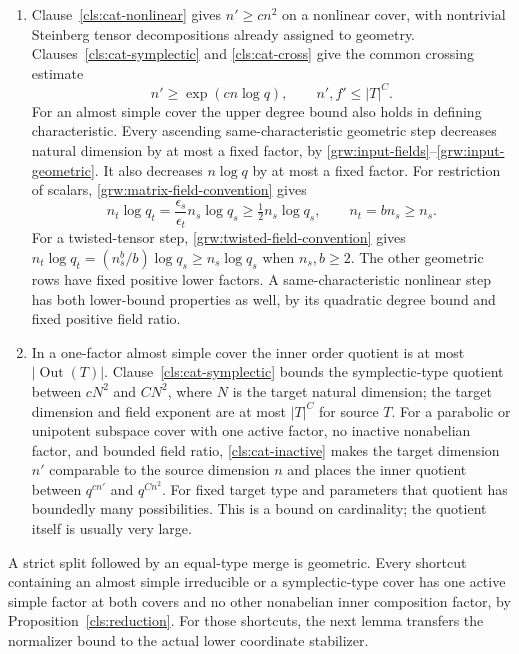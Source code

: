 \begin{enumerate}[label=\textup{(G\arabic*)},ref=G\arabic*]
\item\label{grw:input-degrees}
Clause~\ref{cls:cat-nonlinear} gives $n'\ge c n^2$ on a nonlinear
cover, with nontrivial Steinberg tensor decompositions already
assigned to geometry. Clauses~\ref{cls:cat-symplectic} and
\ref{cls:cat-cross} give the common crossing estimate
\begin{equation}\label{grw:cross-bounds}
 n'\ge \exp(c n\log q),\qquad n',f'\le |T|^C.
\end{equation}
For an almost simple cover the upper degree bound also holds in
defining characteristic.
Every ascending same-characteristic geometric step decreases natural
dimension by at most a fixed factor, by
\ref{grw:input-fields}--\ref{grw:input-geometric}. It also decreases
$n\log q$ by at most a fixed factor. For restriction of scalars,
\eqref{grw:matrix-field-convention} gives
\[
 n_t\log q_t
 =\frac{\epsilon_s}{\epsilon_t}n_s\log q_s
 \ge\tfrac12 n_s\log q_s,
 \qquad n_t=b n_s\ge n_s.
\]
For a twisted-tensor step,
\eqref{grw:twisted-field-convention} gives
$n_t\log q_t=(n_s^b/b)\log q_s\ge n_s\log q_s$ when $n_s,b\ge2$.
The other geometric rows have fixed positive lower factors. A
same-characteristic nonlinear step has both lower-bound properties
as well, by its quadratic degree bound and fixed positive field ratio.

\item\label{grw:input-multipliers}
In a one-factor almost simple cover the inner order quotient is at
most $|\operatorname{Out}(T)|$. Clause~\ref{cls:cat-symplectic}
bounds the symplectic-type quotient between $cN^2$ and $CN^2$,
where $N$ is the target natural dimension; the target dimension
and field exponent are at most $|T|^C$ for source $T$.
For a parabolic or unipotent subspace cover with one active factor,
no inactive nonabelian factor, and bounded field ratio,
\ref{cls:cat-inactive} makes the target dimension $n'$ comparable
to the source dimension $n$ and places the inner quotient between
$q^{c n'}$ and $q^{C n^2}$. For fixed target type and parameters
that quotient has boundedly many possibilities. This is a bound
on cardinality; the quotient itself is usually very large.
\end{enumerate}

A strict split followed by an equal-type merge is geometric.
Every shortcut containing an almost simple irreducible or a
symplectic-type cover has one active simple factor at both covers
and no other nonabelian inner
composition factor, by Proposition~\ref{cls:reduction}. For those
shortcuts, the next lemma transfers the normalizer bound to the
actual lower coordinate stabilizer.

